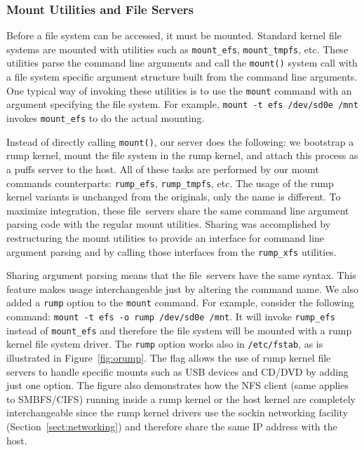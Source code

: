 \subsubsection{Mount Utilities and File Servers}

Before a file system can be accessed, it must be mounted.  Standard
kernel file systems are mounted with utilities such as \verb+mount_efs+,
\verb+mount_tmpfs+, etc.  These utilities parse the command line
arguments and call the \texttt{mount()} system call with a file system
specific argument structure built from the command line arguments.  One typical
way of invoking these utilities is to use the \texttt{mount} command
with an argument specifying the file system.  For example,
\verb+mount -t efs /dev/sd0e /mnt+ invokes \verb+mount_efs+ to do
the actual mounting.

Instead of directly calling \texttt{mount()}, our server does the
following: we bootstrap a rump
kernel, mount the file system in the rump kernel, and attach this
process as a puffs server to the host.  All of these tasks are
performed by our mount commands counterparts: \verb+rump_efs+,
\verb+rump_tmpfs+, etc.  The usage of the rump kernel variants is
unchanged from the originals, only the name is different.
To maximize integration, these file~servers share the same command
line argument parsing code with the regular mount utilities.  Sharing
was accomplished by restructuring the mount utilities to provide an interface
for command line argument parsing and by calling those interfaces from
the \verb+rump_xfs+ utilities.

Sharing argument parsing means that the file~servers have the
same syntax.  This feature makes usage interchangeable just by altering the
command name.  We also added a \texttt{rump} option to the
\texttt{mount} command.  For example,
consider the following command: \verb+mount -t efs -o rump /dev/sd0e /mnt+.
It will invoke \verb+rump_efs+ instead of \verb+mount_efs+
and therefore the file system will be mounted with a rump kernel
file system driver.
The \texttt{rump} option works also in
\texttt{/etc/fstab}, as is illustrated in Figure~\ref{fig:orump}.
The flag allows the use of rump kernel file servers to handle specific
mounts such as USB devices and CD/DVD by adding just one option.
The figure also demonstrates how the NFS client (same applies to SMBFS/CIFS)
running inside a rump kernel or the host kernel are completely
interchangeable since the rump kernel drivers use the sockin
networking facility (Section~\ref{sect:networking}) and therefore
share the same IP address with the host.

